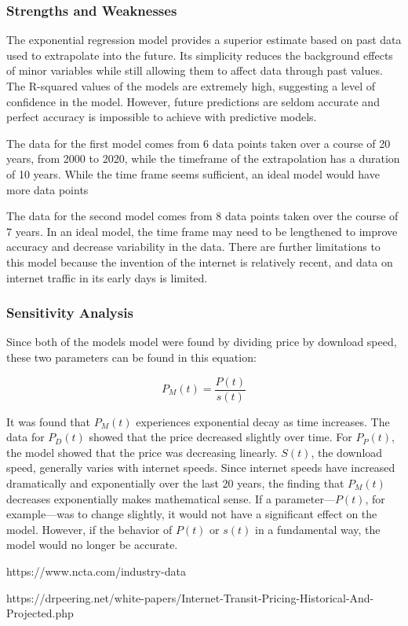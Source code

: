     \subsubsection{Strengths and Weaknesses}

    The exponential regression model provides a superior estimate based on past data used to extrapolate into the future. Its simplicity reduces the background effects of minor variables while still allowing them to affect data through past values. The R-squared values of the models are extremely high, suggesting a level of confidence in the model. However, future predictions are seldom accurate and perfect accuracy is impossible to achieve with predictive models.

    The data for the first model comes from 6 data points taken over a course of 20 years, from 2000 to 2020, while the timeframe of the extrapolation has a duration of 10 years. While the time frame seems sufficient, an ideal model would have more data points 

    The data for the second model comes from 8 data points taken over the course of 7 years. In an ideal model, the time frame may need to be lengthened to improve accuracy and decrease variability in the data. There are further limitations to this model because the invention of the internet is relatively recent, and data on internet traffic in its early days is limited.

    \subsubsection{Sensitivity Analysis}
    Since both of the models model were found by dividing price by download speed, these two parameters can be found in this equation:
    
    $$P_M(t)=\frac{P(t)}{s(t)}$$
    
    It was found that $P_M(t)$ experiences exponential decay as time increases. The data for $P_D(t)$ showed that the price decreased slightly over time. For $P_P(t)$, the model showed that the price was decreasing linearly. $S(t)$, the download speed, generally varies with internet speeds. Since internet speeds have increased dramatically and exponentially over the last 20 years, the finding that $P_M(t)$ decreases exponentially makes mathematical sense. If a parameter—$P(t)$, for example—was to change slightly, it would not have a significant effect on the model. However, if the behavior of $P(t)$ or $s(t)$ in a fundamental way, the model would no longer be accurate.


\pagebreak
\begin{thebibliography}{2}

\bibitem{} 
https://www.ncta.com/industry-data

\bibitem{}
https://drpeering.net/white-papers/Internet-Transit-Pricing-Historical-And-Projected.php


\end{thebibliography}
